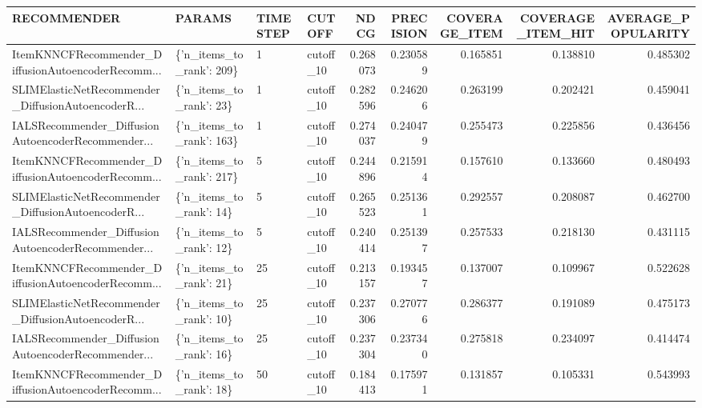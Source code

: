 \begin{tabular}{llllrrrrr}
\toprule
                                       RECOMMENDER &                   PARAMS & TIMESTEP &    CUTOFF &     NDCG &  PRECISION &  COVERAGE\_ITEM &  COVERAGE\_ITEM\_HIT &  AVERAGE\_POPULARITY \\
\midrule
ItemKNNCFRecommender\_DiffusionAutoencoderRecomm... & \{'n\_items\_to\_rank': 209\} &        1 & cutoff\_10 & 0.268073 &   0.230589 &       0.165851 &           0.138810 &            0.485302 \\
SLIMElasticNetRecommender\_DiffusionAutoencoderR... &  \{'n\_items\_to\_rank': 23\} &        1 & cutoff\_10 & 0.282596 &   0.246206 &       0.263199 &           0.202421 &            0.459041 \\
IALSRecommender\_DiffusionAutoencoderRecommender... & \{'n\_items\_to\_rank': 163\} &        1 & cutoff\_10 & 0.274037 &   0.240479 &       0.255473 &           0.225856 &            0.436456 \\
ItemKNNCFRecommender\_DiffusionAutoencoderRecomm... & \{'n\_items\_to\_rank': 217\} &        5 & cutoff\_10 & 0.244896 &   0.215914 &       0.157610 &           0.133660 &            0.480493 \\
SLIMElasticNetRecommender\_DiffusionAutoencoderR... &  \{'n\_items\_to\_rank': 14\} &        5 & cutoff\_10 & 0.265523 &   0.251361 &       0.292557 &           0.208087 &            0.462700 \\
IALSRecommender\_DiffusionAutoencoderRecommender... &  \{'n\_items\_to\_rank': 12\} &        5 & cutoff\_10 & 0.240414 &   0.251397 &       0.257533 &           0.218130 &            0.431115 \\
ItemKNNCFRecommender\_DiffusionAutoencoderRecomm... &  \{'n\_items\_to\_rank': 21\} &       25 & cutoff\_10 & 0.213157 &   0.193457 &       0.137007 &           0.109967 &            0.522628 \\
SLIMElasticNetRecommender\_DiffusionAutoencoderR... &  \{'n\_items\_to\_rank': 10\} &       25 & cutoff\_10 & 0.237306 &   0.270776 &       0.286377 &           0.191089 &            0.475173 \\
IALSRecommender\_DiffusionAutoencoderRecommender... &  \{'n\_items\_to\_rank': 16\} &       25 & cutoff\_10 & 0.237304 &   0.237340 &       0.275818 &           0.234097 &            0.414474 \\
ItemKNNCFRecommender\_DiffusionAutoencoderRecomm... &  \{'n\_items\_to\_rank': 18\} &       50 & cutoff\_10 & 0.184413 &   0.175971 &       0.131857 &           0.105331 &            0.543993 \\

\end{tabular}
